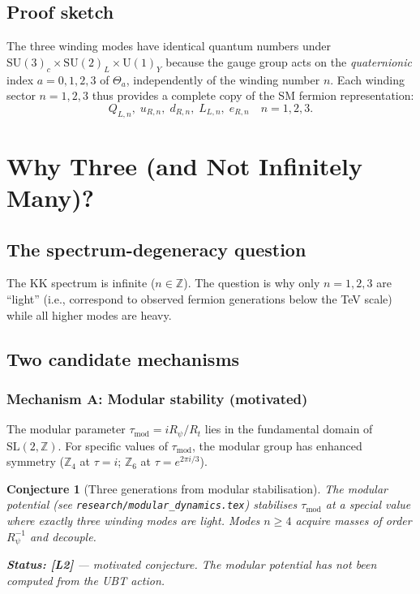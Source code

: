 \documentclass[11pt,a4paper]{article}
\newtheorem{conjecture}{Conjecture}
\begin{document}
\subsection{Proof sketch}

The three winding modes have identical quantum numbers under
$\mathrm{SU}(3)_c \times \mathrm{SU}(2)_L \times \mathrm{U}(1)_Y$ because
the gauge group acts on the \emph{quaternionic} index $a = 0,1,2,3$ of
$\Theta_a$, independently of the winding number $n$.  Each winding sector
$n = 1, 2, 3$ thus provides a complete copy of the SM fermion representation:
\begin{equation}
  Q_{L,n},\; u_{R,n},\; d_{R,n},\; L_{L,n},\; e_{R,n}
  \quad n = 1, 2, 3.
\end{equation}

\section{Why Three (and Not Infinitely Many)?}
\label{sec:why_three}

\subsection{The spectrum-degeneracy question}

The KK spectrum is infinite ($n \in \mathbb{Z}$).  The question is why only
$n = 1, 2, 3$ are ``light'' (i.e., correspond to observed fermion generations
below the TeV scale) while all higher modes are heavy.

\subsection{Two candidate mechanisms}

\subsubsection{Mechanism A: Modular stability (motivated)}

The modular parameter $\tau_{\mathrm{mod}} = iR_\psi/R_t$ lies in the
fundamental domain of $\mathrm{SL}(2,\mathbb{Z})$.  For specific values of
$\tau_{\mathrm{mod}}$, the modular group has enhanced symmetry ($\mathbb{Z}_4$
at $\tau = i$; $\mathbb{Z}_6$ at $\tau = e^{2\pi i/3}$).

\begin{conjecture}[Three generations from modular stabilisation]\label{conj:modular}
  The modular potential (see \texttt{research/modular\_dynamics.tex})
  stabilises $\tau_{\mathrm{mod}}$ at a special value where exactly three
  winding modes are light.  Modes $n \geq 4$ acquire masses of order
  $R_\psi^{-1}$ and decouple.

  \textbf{Status: [L2]} — motivated conjecture.  The modular potential has
  not been computed from the UBT action.
\end{conjecture}
\end{document}
